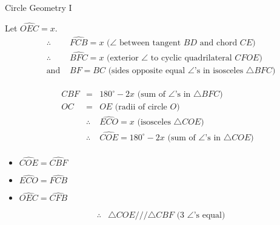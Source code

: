 \begin{wex}{%
Circle Geometry I}
{
Let $\hat{OEC} = x$.
\begin{eqnarray*}
&\therefore& \hat{FCB} = x \mbox{ ($\angle$ between tangent $BD$ and chord $CE$)}\\
&\therefore& \hat{BFC} = x \mbox{ (exterior $\angle$ to cyclic quadrilateral $CFOE$)}\\
&\mbox{and }& BF = BC \mbox{ (sides opposite equal $\angle$'s in isosceles $\triangle{BFC}$)}
\end{eqnarray*}

\begin{eqnarray*}
\hat{CBF} &=& 180^\circ - 2x \mbox{ (sum of $\angle$'s in $\triangle{BFC}$)}\\
OC &=& OE \mbox{ (radii of circle $O$)}\\
&\therefore& \hat{ECO} = x \mbox{ (isosceles $\triangle{COE}$)}\\
&\therefore& \hat{COE} = 180^\circ - 2x \mbox{ (sum of $\angle$'s in $\triangle{COE}$)}\\
\end{eqnarray*}
\begin{minipage}[H]{1.0\textwidth}
\begin{itemize}
\item $\hat{COE} = \hat{CBF}$
\item $\hat{ECO} = \hat{FCB}$
\item $\hat{OEC} = \hat{CFB}$
\end{itemize}
\end{minipage}
\begin{eqnarray*}
&\therefore& \triangle{COE} /// \triangle{CBF} \mbox{ (3 $\angle$'s equal)}\\
\end{eqnarray*}

}
\end{wex}
